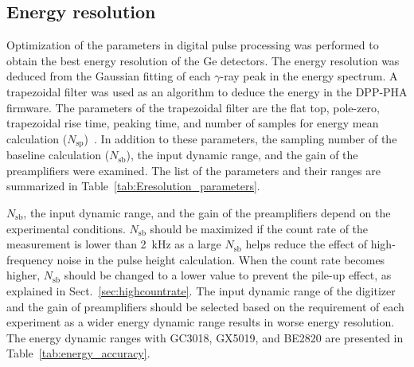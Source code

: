 \subsection{Energy resolution}\label{sec:Eresolution}
Optimization of the parameters in digital pulse processing was performed to obtain the best energy resolution of the Ge detectors.
The energy resolution was deduced from the Gaussian fitting of each $\gamma$-ray peak in the energy spectrum.
A trapezoidal filter was used as an algorithm to deduce the energy in the DPP-PHA firmware.
The parameters of the trapezoidal filter are 
the flat top, pole-zero, trapezoidal rise time, peaking time, and number of samples for energy mean calculation ($N_\mathrm{sp}$)~\cite{DPP-PHAandPSD}.
In addition to these parameters, the sampling number of the baseline calculation ($N_\mathrm{sb}$), 
the input dynamic range, and the gain of the preamplifiers were examined. %
The list of the parameters and their ranges are summarized in Table~\ref{tab:Eresolution_parameters}.

$N_\mathrm{sb}$, the input dynamic range, and the gain of the preamplifiers depend on the experimental conditions.
$N_\mathrm{sb}$ should be maximized if the count rate of the measurement is lower than 2~kHz as a large $N_\mathrm{sb}$ helps reduce the effect of high-frequency noise in the pulse height calculation.
When the count rate becomes higher, $N_\mathrm{sb}$ should be changed to a lower value to prevent the pile-up effect, as explained in Sect.~\ref{sec:highcountrate}.
The input dynamic range of the digitizer and the gain of preamplifiers should be selected based on the requirement of each experiment as 
a wider energy dynamic range results in worse energy resolution.
The energy dynamic ranges with GC3018, GX5019, and BE2820 are presented in Table~\ref{tab:energy_accuracy}.


